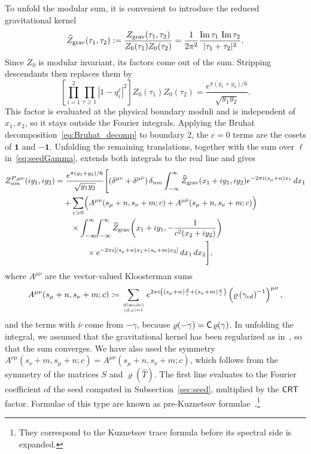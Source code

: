 \documentclass[11pt]{article}
\numberwithin{equation}{section}
\newcommand{\Zgrav}{Z_{\rm grav}}
\newcommand{\vr}{\varrho}
\begin{document}
To unfold the modular sum, it is convenient to introduce the reduced
gravitational kernel
\[
\widehat Z_{\rm grav}(\tau_1,\tau_2)
:=\frac{\Zgrav(\tau_1,\tau_2)}{Z_0(\tau_1)Z_0(\tau_2)}
=\frac{1}{2\pi^2}
\frac{\operatorname{Im}\tau_1\,\operatorname{Im}\tau_2}
{|\tau_1+\tau_2|^2}.
\]
Since $Z_0$ is modular invariant, its factors come out of the sum.
Stripping descendants then replaces them by
\[
\left[\prod_{i=1}^2\prod_{r\geq1}|1-q_i^r|^2\right]
Z_0(\tau_1)Z_0(\tau_2)
=\frac{e^{\pi(y_1+y_2)/6}}{\sqrt{y_1y_2}}.
\]
This factor is evaluated at the physical boundary moduli and is independent
of $x_1,x_2$, so it stays outside the Fourier integrals.
Applying the Bruhat decomposition~\eqref{eq:Bruhat_decomp} to boundary 2,
the $c=0$ terms are the cosets of $\mathbf1$ and $-\mathbf1$.
Unfolding the remaining translations, together with the sum over $\ell$
in~\eqref{eq:seedGamma}, extends both integrals to the real line and gives
\begin{align}
Z_{nm}^{P,\mu\nu}(iy_1,iy_2)
&=\frac{e^{\pi(y_1+y_2)/6}}{\sqrt{y_1y_2}}
\Biggl[
(\delta^{\mu\nu}+\delta^{\mu\bar\nu})\,\delta_{nm}
\int_{-\infty}^{\infty}
\widehat Z_{\rm grav}(x_1+iy_1,iy_2)
e^{-2\pi i(s_\mu+n)x_1}\,dx_1
\nonumber\\
&\quad+\sum_{c>0}
\Bigl(A^{\mu\nu}(s_\mu+n,s_\nu+m;c)
+A^{\mu\bar\nu}(s_\mu+n,s_\nu+m;c)\Bigr)
\nonumber\\
&\qquad\times
\int_{-\infty}^{\infty}\!\!\int_{-\infty}^{\infty}
\widehat Z_{\rm grav}\!\left(
x_1+iy_1,-\frac{1}{c^2(x_2+iy_2)}\right)
\nonumber\\
&\qquad\qquad\times
e^{-2\pi i[(s_\mu+n)x_1+(s_\nu+m)x_2]}
\,dx_1\,dx_2
\Biggr],
\label{eq:preK}
\end{align}
where $A^{\mu\nu}$ are the vector-valued Kloosterman sums
\begin{align}
   A^{\mu \nu}(s_\mu+n,s_\nu+m;c)\coloneqq \sum_{d(\mathrm{mod}c)\atop (d,c)=1} e^{2\pi i\left((s_\mu+n)\frac{d}{c}+(s_\nu+m)\frac{a}{c} \right)}  \left(\vr\left(\gamma_{cd} \right)^{-1}\right)^{\mu \nu},
   \label{eq:Kloost_VMF_sec3}
\end{align}
 and the terms with $\bar\nu$ come from $-\gamma$, because $\vr(-\gamma)=\Cc\,\vr(\gamma)$. In unfolding the integral, we assumed that the gravitational kernel has been regularized as in~\cite{Cotler:2020ugk}, so that the sum converges. We have also used the symmetry $A^{\nu\mu}(s_\nu+m,s_\mu+n;c)=A^{\mu\nu}(s_\mu+n,s_\nu+m;c)$, which follows from the symmetry of the matrices $S$ and $\vr(\hat T)$. The first line evaluates to the Fourier coefficient of the seed computed in Subsection~\ref{sec:seed}, multiplied by the $\mathsf{CRT}$ factor. Formulae of this type are known as pre-Kuznetsov formulae~\cite{Iwaniec2002SpectralMO}.\footnote{They correspond to the Kuznetsov trace formula before its spectral side is expanded.}
\end{document}
